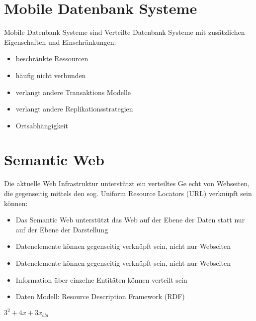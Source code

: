 \documentclass[a4paper,10pt,titlepage=false]{scrreprt}
\begin{document}
\section{Mobile Datenbank Systeme}
Mobile Datenbank Systeme sind Verteilte Datenbank
Systeme mit zusätzlichen Eigenschaften und
Einschränkungen:
\begin{itemize}
\item beschränkte Ressourcen
\item häufig nicht verbunden
\item verlangt andere Transaktions Modelle
\item verlangt andere Replikationsstrategien
\item Ortsabhängigkeit
\end{itemize}


\section{Semantic Web}
Die aktuelle Web Infrastruktur unterstützt ein verteiltes
Ge echt von Webseiten, die gegenseitig mittels den sog.
Uniform Resource Locators (URL) verknüpft sein können:
\begin{itemize}
 \item Das Semantic Web
unterstützt das Web auf der Ebene der Daten statt nur
auf der Ebene der Darstellung
\item Datenelemente können gegenseitig verknüpft sein,
nicht nur Webseiten
\item Datenelemente können gegenseitig verknüpft sein,
nicht nur Webseiten
\item Information über einzelne Entitäten können verteilt
sein
\item Daten Modell: Resource Description Framework (RDF)
\end{itemize}
$ 3^2 + 4x + 3x_{bla}$
\end{document}
